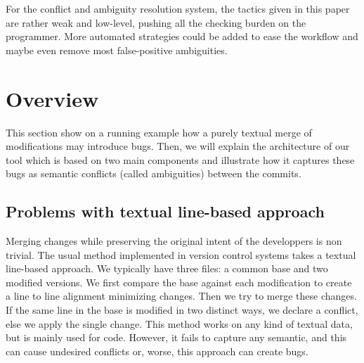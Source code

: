 \documentclass[a4paper,11pt]{article}
\begin{document}
For the conflict and ambiguity resolution system, the tactics given in this paper are rather weak and low-level, pushing all the checking burden on the programmer. More automated strategies could be added to ease the workflow and maybe even remove most false-positive ambiguities.

\section{Overview}
\label{sec:overview}

This section show on a running example how a purely textual merge of modifications may introduce bugs. Then, we will explain the architecture of our tool which is based on two main components and illustrate how it captures these bugs as semantic conflicts (called ambiguities) between the commits.

\subsection{Problems with textual line-based approach}
Merging changes while preserving the original intent of the
developpers is non trivial. The usual method implemented in version
control systems takes a textual line-based approach. We typically have
three files: a common base and two modified versions. We first compare
the base against each modification to create a line to line alignment
minimizing changes. Then we try to merge these changes. If the same
line in the base is modified in two distinct ways, we declare a
conflict, else we apply the single change. This method works on any
kind of textual data, but is mainly used for code. However, it fails
to capture any semantic, and this can cause undesired conflicts or,
worse, this approach can create bugs.
\end{document}
